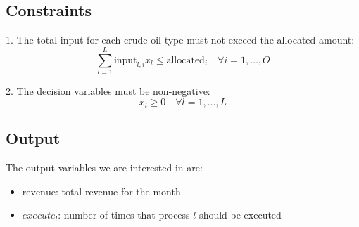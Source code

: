 \documentclass{article}
\begin{document}
\subsection*{Constraints}

1. The total input for each crude oil type must not exceed the allocated amount:
\[
\sum_{l=1}^{L} \text{input}_{l,i} x_l \leq \text{allocated}_i \quad \forall i = 1, \ldots, O
\]

2. The decision variables must be non-negative:
\[
x_l \geq 0 \quad \forall l = 1, \ldots, L
\]

\subsection*{Output}
The output variables we are interested in are:
\begin{itemize}
    \item $\text{revenue}$: total revenue for the month
    \item $execute_l$: number of times that process $l$ should be executed
\end{itemize}
\end{document}
